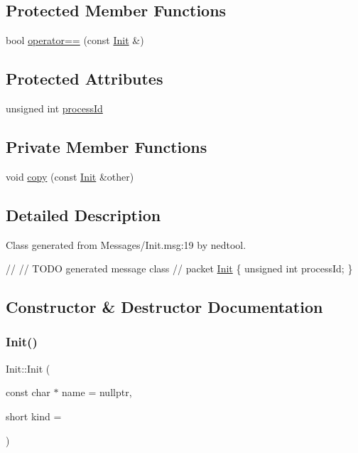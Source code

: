 \subsection*{Protected Member Functions}
\begin{DoxyCompactItemize}
\item 
bool \hyperlink{classInit_a474b7c9ffdf72a6b2b58558ce68bb03e}{operator==} (const \hyperlink{classInit}{Init} \&)
\end{DoxyCompactItemize}
\subsection*{Protected Attributes}
\begin{DoxyCompactItemize}
\item 
unsigned int \hyperlink{classInit_a3adbaa4c454127a34eaab69297b44585}{process\+Id}
\end{DoxyCompactItemize}
\subsection*{Private Member Functions}
\begin{DoxyCompactItemize}
\item 
void \hyperlink{classInit_a045745f591e312608e5ee3639f4459ba}{copy} (const \hyperlink{classInit}{Init} \&other)
\end{DoxyCompactItemize}


\subsection{Detailed Description}
Class generated from {\ttfamily Messages/\+Init.\+msg\+:19} by nedtool. 
\begin{DoxyPre}
//
// TODO generated message class
//
packet \hyperlink{classInit}{Init}
\{
    unsigned int processId;
\}
\end{DoxyPre}
 

\subsection{Constructor \& Destructor Documentation}
\mbox{\label{classInit_a763a386107f8ea21acfd24f243e0f73c}} 
\subsubsection{\texorpdfstring{Init()}{Init()}\hspace{0.1cm}{\footnotesize\ttfamily [1/2]}}
{\footnotesize\ttfamily Init\+::\+Init (\begin{DoxyParamCaption}\item[{const char $\ast$}]{name = {\ttfamily nullptr},  }\item[{short}]{kind = {} }\end{DoxyParamCaption})}

